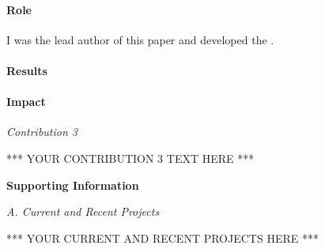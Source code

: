 \documentclass[12pt]{article}
\begin{document}
\paragraph{Role}
I was the lead author of this paper and developed the  .

\paragraph{Results} 

\paragraph{Impact} 



\vspace{10pt}
\raggedright \textit{Contribution 3} \\
\vspace{10pt}


*** YOUR CONTRIBUTION 3 TEXT HERE ***

\vspace{10pt}
\centering \textbf{Supporting Information} \\


\vspace{10pt}
\raggedright \large \textit{A. Current and Recent Projects} \\
\normalsize
\vspace{10pt}




*** YOUR CURRENT AND RECENT PROJECTS HERE ***
\end{document}

